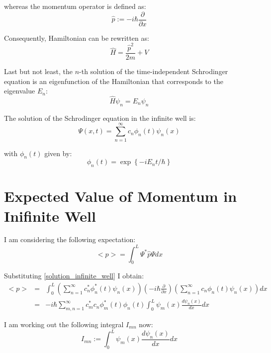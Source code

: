 \documentclass[12pt]{article}
\begin{document}
\noindent whereas the momentum operator is defined as:
\begin{equation}
\hat{p} := -i \hbar \frac{\partial}{\partial x}
\end{equation}

\noindent Consequently, Hamiltonian can be rewritten as:
\begin{equation}
\hat{H} = \frac{\hat{p}^2}{2m} + V
\end{equation}

\noindent Last but not least, the $n$-th solution of the time-independent Schrodinger equation is an eigenfunction of the Hamiltonian that corresponds to the eigenvalue $E_n$:
\begin{equation}
\hat{H} \psi_n = E_n \psi_n
\end{equation}

\noindent The solution of the Schrodinger equation in the infinite well is:
\begin{equation}
\label{solution_infinite_well}
\Psi(x, t) = \sum_{n=1}^{\infty} c_n \phi_n(t) \psi_n(x)
\end{equation}

\noindent with $\phi_n(t)$ given by:
\begin{equation}
\phi_n(t) = \exp \left\lbrace 
- i E_n t / \hbar
\right\rbrace
\end{equation}


\section{Expected Value of Momentum in Inifinite Well}
I am considering the following expectation:
\begin{equation}
<p> = \int_{0}^{L} \Psi^{*} \hat{p} \Psi dx
\end{equation}

\noindent Substituting \eqref{solution_infinite_well} I obtain:
\begin{eqnarray*}
<p> &=& \int_{0}^{L} \left(  
		\sum_{n=1}^{\infty} c_{n}^{*} \phi_{n}^{*}(t) \psi_n(x) 
	\right) 
	\left( - i \hbar \frac{\partial}{\partial x} \right)
	\left(  
		\sum_{n=1}^{\infty} c_{n} \phi_{n}(t) \psi_n(x) 
	\right) dx \\
	&=& -i \hbar \sum_{m, n = 1}^{\infty} c_{m}^{*} c_n  \phi_{m}^{*}(t) \phi_{n}(t) \int_{0}^{L} \psi_{m}(x) \frac{d \psi_n(x)}{dx} dx
\end{eqnarray*}

\noindent I am working out the following integral $I_{mn}$ now:
\begin{equation}
I_{mn} := \int_{0}^{L} \psi_{m}(x) \frac{d \psi_n(x)}{dx} dx
\end{equation}
\end{document}
